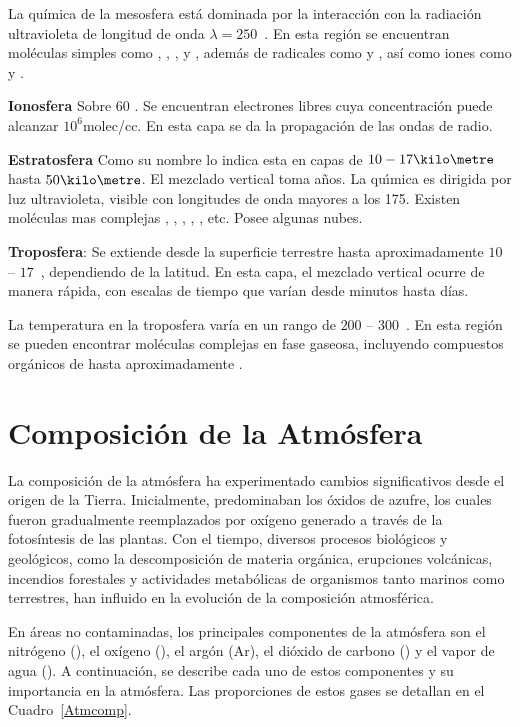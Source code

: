 La química de la mesosfera está dominada por la interacción con la radiación ultravioleta de longitud de onda $\lambda = 250$~\nano\metre. En esta región se encuentran moléculas simples como , , ,  y , además de radicales como  y , así como iones como  y .
 

 \textbf{Ionosfera} Sobre 60 \kilo\metre. Se encuentran electrones libres cuya concentraci\'on puede alcanzar $10^6$molec/cc. En esta capa se da la propagaci\'on de las ondas de radio.
 
 \textbf{Estratosfera} Como su nombre lo indica esta en capas de $10-17 \kilo\metre$ hasta $50\kilo\metre$. El mezclado vertical toma a\~nos. La qu\'{\i}mica es dirigida por luz ultravioleta, visible con longitudes de onda mayores a los 175\nano\metre. Existen mol\'eculas mas complejas , , , , , etc. Posee algunas nubes.
 
\textbf{Troposfera}: Se extiende desde la superficie terrestre hasta aproximadamente $10$ -- $17$~\kilo\metre, dependiendo de la latitud. En esta capa, el mezclado vertical ocurre de manera rápida, con escalas de tiempo que varían desde minutos hasta días.  

La temperatura en la troposfera varía en un rango de $200$ -- $300$~\kelvin. En esta región se pueden encontrar moléculas complejas en fase gaseosa, incluyendo compuestos orgánicos de hasta aproximadamente .

  \section{Composición de la Atmósfera}

La composición de la atmósfera ha experimentado cambios significativos desde el origen de la Tierra. Inicialmente, predominaban los óxidos de azufre, los cuales fueron gradualmente reemplazados por oxígeno generado a través de la fotosíntesis de las plantas. Con el tiempo, diversos procesos biológicos y geológicos, como la descomposición de materia orgánica, erupciones volcánicas, incendios forestales y actividades metabólicas de organismos tanto marinos como terrestres, han influido en la evolución de la composición atmosférica.

En áreas no contaminadas, los principales componentes de la atmósfera son el nitrógeno (), el oxígeno (), el argón (Ar), el dióxido de carbono () y el vapor de agua (). A continuación, se describe cada uno de estos componentes y su importancia en la atmósfera. Las proporciones de estos gases se detallan en el Cuadro~\ref{Atmcomp}.

